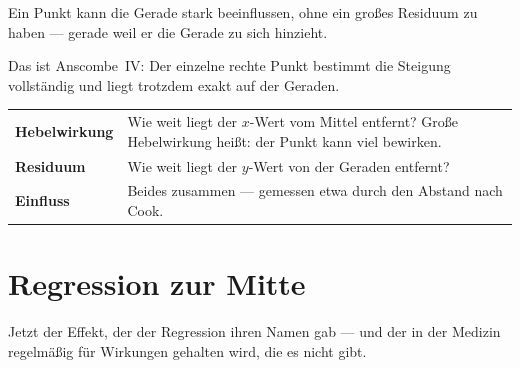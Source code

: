 \begin{warnung}
Ein Punkt kann die Gerade stark beeinflussen, ohne ein großes Residuum zu haben --- gerade weil er die Gerade zu sich hinzieht.

Das ist Anscombe~IV: Der einzelne rechte Punkt bestimmt die Steigung vollständig und liegt trotzdem exakt auf der Geraden.

\begin{center}
\renewcommand{\arraystretch}{1.5}
\begin{tabular}{@{}P{2.8cm}P{5.8cm}@{}}
\toprule
\textbf{Hebel\-wirkung} & Wie weit liegt der $x$-Wert vom Mittel entfernt? Große Hebelwirkung heißt: der Punkt kann viel bewirken.\\
\textbf{Residuum} & Wie weit liegt der $y$-Wert von der Geraden entfernt?\\
\textbf{Einfluss} & Beides zusammen --- gemessen etwa durch den Abstand nach Cook.\\
\bottomrule
\end{tabular}
\end{center}

\begin{center}
\begin{minipage}{0.88\textwidth}
\end{minipage}
\end{center}
\end{warnung}

\section{Regression zur Mitte}

Jetzt der Effekt, der der Regression ihren Namen gab --- und der in der Medizin regelmäßig für Wirkungen gehalten wird, die es nicht gibt.

